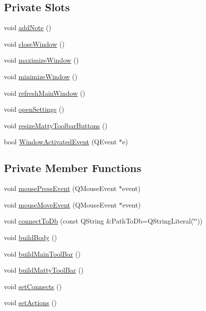 \subsection*{Private Slots}
\begin{DoxyCompactItemize}
\item 
void \hyperlink{classMattyNotesMainWindow_af77c5a79f0a941dbb980776df6a8b1eb}{add\+Note} ()
\item 
void \hyperlink{classMattyNotesMainWindow_ad4e9dfde3914909695d85c12e3d9894c}{close\+Window} ()
\item 
void \hyperlink{classMattyNotesMainWindow_aa04cca9a2d55f2f1625bd18892a8814a}{maximize\+Window} ()
\item 
void \hyperlink{classMattyNotesMainWindow_a91131115f70c09c62b50bf71bc4b0d73}{minimize\+Window} ()
\item 
void \hyperlink{classMattyNotesMainWindow_a12025cd56092bb34c6451a92197b69a1}{refresh\+Main\+Window} ()
\item 
void \hyperlink{classMattyNotesMainWindow_a174545072bf37c8b69a8447855b636f7}{open\+Settings} ()
\item 
void \hyperlink{classMattyNotesMainWindow_a7fd491b7b955e57d8f93143c7c5e784b}{resize\+Matty\+Toolbar\+Buttons} ()
\item 
bool \hyperlink{classMattyNotesMainWindow_acb9472c3ba8430272c29864b5d046ea3}{Window\+Activated\+Event} (Q\+Event $\ast$e)
\end{DoxyCompactItemize}
\subsection*{Private Member Functions}
\begin{DoxyCompactItemize}
\item 
void \hyperlink{classMattyNotesMainWindow_af6fed8f1ef3716a2b3074fd7f78ee23a}{mouse\+Press\+Event} (Q\+Mouse\+Event $\ast$event)
\item 
void \hyperlink{classMattyNotesMainWindow_a83425b00e2b3bdbe213535894b11cc3a}{mouse\+Move\+Event} (Q\+Mouse\+Event $\ast$event)
\item 
void \hyperlink{classMattyNotesMainWindow_acd6f123f89d4e5f1d240cbd54e92d1fc}{connect\+To\+Db} (const Q\+String \&Path\+To\+Db=Q\+String\+Literal(\char`\"{}\char`\"{}))
\item 
void \hyperlink{classMattyNotesMainWindow_af75387f6dfa1be40552c54a91795d196}{build\+Body} ()
\item 
void \hyperlink{classMattyNotesMainWindow_a060784fda6abdec934d9c37843e8d05a}{build\+Main\+Tool\+Bar} ()
\item 
void \hyperlink{classMattyNotesMainWindow_a1ded942c8dec7b0443eef1c51a425af4}{build\+Matty\+Tool\+Bar} ()
\item 
void \hyperlink{classMattyNotesMainWindow_a1736856c4d60ba43f973d5bd627f0ec0}{set\+Connects} ()
\item 
void \hyperlink{classMattyNotesMainWindow_a1f827486a3eaaf0ce59f8ea4bc70ab87}{set\+Actions} ()
\end{DoxyCompactItemize}

